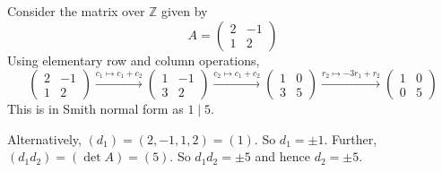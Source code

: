 \begin{example}
	Consider the matrix over \( \mathbb Z \) given by
	\[
		A = \begin{pmatrix}
			2 & -1 \\
			1 & 2
		\end{pmatrix}
	\]
	Using elementary row and column operations,
	\[
		\begin{pmatrix}
			2 & -1 \\
			1 & 2
		\end{pmatrix} \xrightarrow{c_1 \mapsto c_1 + c_2} \begin{pmatrix}
			1 & -1 \\
			3 & 2
		\end{pmatrix} \xrightarrow{c_2 \mapsto c_1 + c_2} \begin{pmatrix}
			1 & 0 \\
			3 & 5
		\end{pmatrix} \xrightarrow{r_2 \mapsto -3r_1 + r_2} \begin{pmatrix}
			1 & 0 \\
			0 & 5
		\end{pmatrix}
	\]
	This is in Smith normal form as \( 1 \mid 5 \).

	Alternatively, \( (d_1) = (2, -1, 1, 2) = (1) \).
	So \( d_1 = \pm 1 \).
	Further, \( (d_1 d_2) = (\det A) = (5) \).
	So \( d_1 d_2 = \pm 5 \) and hence \( d_2 = \pm 5 \).
\end{example}

